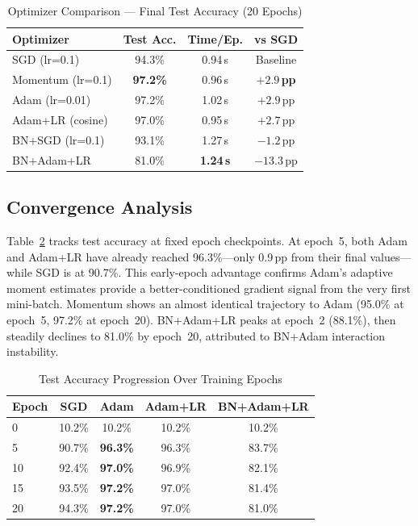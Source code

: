 \documentclass[runningheads]{llncs}
\begin{document}
\begin{table}[htb]
\caption{Optimizer Comparison — Final Test Accuracy (20 Epochs)}
\label{tab:optimizer}
\centering
\begin{tabular}{lccc}
\toprule
\textbf{Optimizer} & \textbf{Test Acc.} & \textbf{Time/Ep.}
  & \textbf{vs SGD}\\
\midrule
SGD (lr=0.1)      & 94.3\%          & 0.94\,s & Baseline \\
Momentum (lr=0.1) & \textbf{97.2\%} & 0.96\,s
  & $\mathbf{+2.9}$\,\textbf{pp} \\
Adam (lr=0.01)    & 97.2\%          & 1.02\,s & $+2.9$\,pp \\
Adam+LR (cosine)  & 97.0\%          & 0.95\,s & $+2.7$\,pp \\
BN+SGD (lr=0.1)   & 93.1\%          & 1.27\,s & $-1.2$\,pp \\
BN+Adam+LR        & 81.0\%          & \textbf{1.24\,s} & $-13.3$\,pp \\
\bottomrule
\end{tabular}
\end{table}

\subsection{Convergence Analysis}

Table~\ref{tab:convergence} tracks test accuracy at fixed epoch
checkpoints. At epoch~5, both Adam and Adam+LR have already reached
96.3\%—only 0.9\,pp from their final values—while SGD is at 90.7\%. This
early-epoch advantage confirms Adam's adaptive moment estimates provide a
better-conditioned gradient signal from the very first mini-batch. Momentum
shows an almost identical trajectory to Adam (95.0\% at epoch~5, 97.2\%
at epoch~20). BN+Adam+LR peaks at epoch~2 (88.1\%), then steadily declines
to 81.0\% by epoch~20, attributed to BN+Adam interaction instability.

\begin{table}[htb]
\caption{Test Accuracy Progression Over Training Epochs}
\label{tab:convergence}
\centering
\begin{tabular}{lcccc}
\toprule
\textbf{Epoch} & \textbf{SGD} & \textbf{Adam} & \textbf{Adam+LR}
  & \textbf{BN+Adam+LR}\\
\midrule
0  & 10.2\% & 10.2\%          & 10.2\% & 10.2\% \\
5  & 90.7\% & \textbf{96.3\%} & 96.3\% & 83.7\% \\
10 & 92.4\% & \textbf{97.0\%} & 96.9\% & 82.1\% \\
15 & 93.5\% & \textbf{97.2\%} & 97.0\% & 81.4\% \\
20 & 94.3\% & \textbf{97.2\%} & 97.0\% & 81.0\% \\
\bottomrule
\end{tabular}
\end{table}
\end{document}
